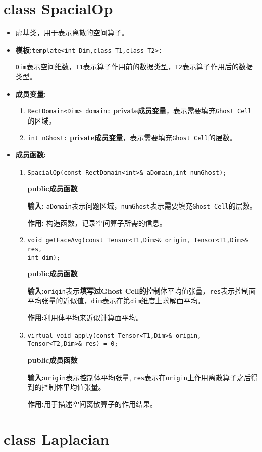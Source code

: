 \documentclass[UTF8]{ctexart}
\theoremstyle{plain}
\theoremstyle{definition}
\theoremstyle{remark}
\begin{document}
\section{class SpacialOp}
\begin{itemize}
    \item 虚基类，用于表示离散的空间算子。
    \item \textbf{模板:}\texttt{template<int Dim,class T1,class T2>:}
    
    \texttt{Dim}表示空间维数，\texttt{T1}表示算子作用前的数据类型，\texttt{T2}表示算子作用后的数据类型。

    \item \textbf{成员变量:}
    \begin{enumerate}
        \item \texttt{RectDomain<Dim> domain:} \textbf{private成员变量}，表示需要填充\texttt{Ghost Cell}的区域。
        \item \texttt{int nGhost:} \textbf{private成员变量}，表示需要填充\texttt{Ghost Cell}的层数。
    \end{enumerate}

    \item \textbf{成员函数:}
    \begin{enumerate}
        \item \texttt{SpacialOp(const RectDomain<int>\& aDomain,int numGhost);}
        
        \textbf{public成员函数}

        \textbf{输入:} \texttt{aDomain}表示问题区域，\texttt{numGhost}表示需要填充\texttt{Ghost Cell}的层数。

        \textbf{作用:} 构造函数，记录空间算子所需的信息。

        \item \texttt{void getFaceAvg(const Tensor<T1,Dim>\& origin, Tensor<T1,Dim>\& res,\\ int dim);}
        
        \textbf{public成员函数}

        \textbf{输入:}\texttt{origin}表示\textbf{填写过Ghost Cell的}控制体平均值张量，\texttt{res}表示控制面平均张量的近似值，\texttt{dim}表示在第\texttt{dim}维度上求解面平均。

        \textbf{作用:}利用体平均来近似计算面平均。

        \item \texttt{virtual void apply(const Tensor<T1,Dim>\& origin, Tensor<T2,Dim>\& res) = 0;}
        
        \textbf{public成员函数}

        \textbf{输入:}\texttt{origin}表示控制体平均张量, \texttt{res}表示在\texttt{origin}上作用离散算子之后得到的控制体平均值张量。

        \textbf{作用:}用于描述空间离散算子的作用结果。
    \end{enumerate}
\end{itemize}
\section{class Laplacian}
\end{document}

